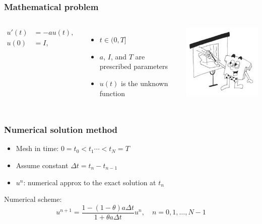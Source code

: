 \documentclass{beamer}
\begin{document}
\begin{frame}
\frametitle{Mathematical problem}

\begin{columns}
\begin{align}
u'(t) &= -au(t),
\label{ode}\\ 
u(0)  &= I,
\label{initial:value}
\end{align}

\begin{itemize}
 \item $t\in (0,T]$

 \item $a$, $I$, and $T$ are prescribed parameters

 \item $u(t)$ is the unknown function
\end{itemize}

\noindent

\begin{center}  %
  \centerline{\includegraphics[width=0.5\linewidth]{fig/teacher2.jpg}}
\end{center}


\end{columns}
\end{frame}

\begin{frame}
\frametitle{Numerical solution method}

\pause
\begin{block}{}
\begin{itemize}
 \item Mesh in time: $0= t_0< t_1 \cdots < t_N=T$

 \item Assume constant $\Delta t = t_{n}-t_{n-1}$

 \item $u^n$: numerical approx to the exact solution at $t_n$
\end{itemize}

\noindent
\end{block}



\pause
\begin{block}{}
Numerical scheme:
   \[
   u^{n+1} = \frac{1 - (1-\theta) a\Delta t}{1 + \theta a\Delta t}u^n,
   \quad n=0,1,\ldots,N-1
   \]
\end{block}
\end{frame}
\end{document}
